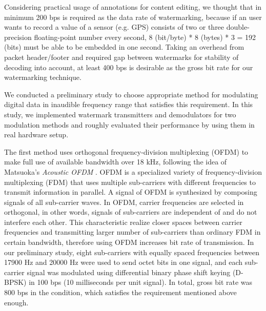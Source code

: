 Considering practical usage of annotations for content editing, we thought that in minimum 200 bps is required as the data rate of watermarking, because if an user wants to record a value of a sensor (e.g. GPS) consists of two or three double-precision floating-point number every second, 8 (bit/byte) * 8 (bytes) * 3 = 192 (bits) must be able to be embedded in one second.
Taking an overhead from packet header/footer and required gap between watermarks for stability of decoding into account, at least 400 bps is desirable as the gross bit rate for our watermarking technique.

We conducted a preliminary study to choose appropriate method for modulating digital data in inaudible frequency range that satisfies this requirement.
In this study, we implemented watermark transmitters and demodulators for two modulation methods and roughly evaluated their performance by using them in real hardware setup.

The first method uses orthogonal frequency-division multiplexing (OFDM) to make full use of available bandwidth over 18 kHz, following the idea of Matsuoka's {\it Acoustic OFDM} \cite{matsuoka2008acoustic}.
OFDM is a specialized variety of frequency-division 
multiplexing (FDM) that uses multiple sub-carriers with different frequencies to transmit information in parallel.
A signal of OFDM is synthesized by composing signals of all sub-carrier waves.
In OFDM, carrier frequencies are selected in orthogonal, in other words, signals of sub-carriers are independent of and do not interfere each other.
This characteristic realize closer spaces between carrier frequencies and transmitting larger number of sub-carriers than ordinary FDM in certain bandwidth, therefore using OFDM increases bit rate of transmission.
In our preliminary study, eight sub-carriers with equally spaced frequencies between 17900 Hz and 20000 Hz were used to send octet bits in one signal, and each sub-carrier signal was modulated using differential binary phase shift keying (D-BPSK) in 100 bps (10 milliseconds per unit signal).
In total, gross bit rate was 800 bps in the condition, which satisfies the requirement mentioned above enough.

